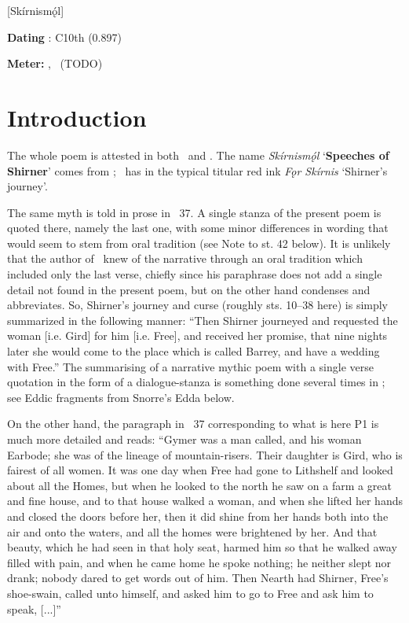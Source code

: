 [Skírnismǫ́l]

\begin{flushright}%
\textbf{Dating} \parencite{Sapp2022}: C10th (0.897)

\textbf{Meter:} \Ljodahattr, \Galdralag\ (TODO)%
\end{flushright}

\section{Introduction}

The whole poem is attested in both \Regius\ and \AM. The name \emph{Skírnismǫ́l} ‘\textbf{Speeches of Shirner}’ comes from \AM; \Regius\ has in the typical titular red ink \emph{Fǫr Skírnis} ‘Shirner’s journey’.

The same myth is told in prose in \Gylfaginning\ 37.  A single stanza of the present poem is quoted there, namely the last one, with some minor differences in wording that would seem to stem from oral tradition (see Note to st. 42 below).  It is unlikely that the author of \Gylfaginning\ knew of the narrative through an oral tradition which included only the last verse, chiefly since his paraphrase does not add a single detail not found in the present poem, but on the other hand condenses and abbreviates.  So, Shirner’s journey and curse (roughly sts. 10–38 here) is simply summarized in the following manner: “Then Shirner journeyed and requested the woman [i.e. Gird] for him [i.e. Free], and received her promise, that nine nights later she would come to the place which is called Barrey, and have a wedding with Free.”  The summarising of a narrative mythic poem with a single verse quotation in the form of a dialogue-stanza is something done several times in \Gylfaginning; see Eddic fragments from Snorre’s Edda below.

On the other hand, the paragraph in \Gylfaginning\ 37 corresponding to what is here P1 is much more detailed and reads: “Gymer was a man called, and his woman Earbode; she was of the lineage of mountain-risers. Their daughter is Gird, who is fairest of all women.  It was one day when Free had gone to Lithshelf and looked about all the Homes, but when he looked to the north he saw on a farm a great and fine house, and to that house walked a woman, and when she lifted her hands and closed the doors before her, then it did shine from her hands both into the air and onto the waters, and all the homes were brightened by her.  And that beauty, which he had seen in that holy seat, harmed him so that he walked away filled with pain, and when he came home he spoke nothing; he neither slept nor drank; nobody dared to get words out of him.  Then Nearth had Shirner, Free’s shoe-swain, called unto himself, and asked him to go to Free and ask him to speak, [...]”

